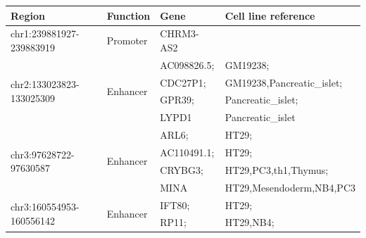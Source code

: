 \begin{table}[]
    \tiny
    \begin{tabularx}{\textwidth}{lllX}
    \toprule
    Region                                     & Function                   & Gene        & Cell line reference                                                             \\ \midrule
    chr1:239881927-239883919                   & Promoter                   & CHRM3-AS2   &                                                                                 \\
    \multirow{4}{*}{chr2:133023823-133025309}  & \multirow{4}{*}{Enhancer}  & AC098826.5; & GM19238;                                                                        \\
                                               &                            & CDC27P1;    & GM19238,Pancreatic\_islet;                                                      \\
                                               &                            & GPR39;      & Pancreatic\_islet;                                                              \\
                                               &                            & LYPD1       & Pancreatic\_islet                                                               \\
    \multirow{4}{*}{chr3:97628722-97630587}    & \multirow{4}{*}{Enhancer}  & ARL6;       & HT29;                                                                           \\
                                               &                            & AC110491.1; & HT29;                                                                           \\
                                               &                            & CRYBG3;     & HT29,PC3,th1,Thymus;                                                            \\
                                               &                            & MINA        & HT29,Mesendoderm,NB4,PC3                                                        \\
    \multirow{9}{*}{chr3:160554953-160556142}  & \multirow{9}{*}{Enhancer}  & IFT80;      & HT29;                                                                           \\
                                               &                            & RP11;       & HT29,NB4;                                                                       \\

\end{tabularx}
\end{table}
